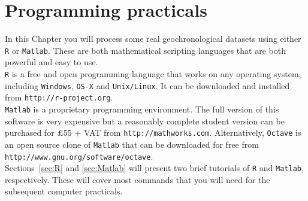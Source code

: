 \chapter{Programming practicals}
\label{sec:programming}

In this Chapter you will process some real geochronological datasets
using either \texttt{R} or \texttt{Matlab}. These are both
mathematical scripting languages that are both powerful and easy to
use.\\

\texttt{R} is a free and open programming language that works on any
operating system, including \texttt{Windows}, \texttt{OS-X} and
\texttt{Unix/Linux}. It can be downloaded and installed from
\texttt{http://r-project.org}.\\

\texttt{Matlab} is a proprietary programming environment. The full
version of this software is very expensive but a reasonably complete
student version can be purchased for $\pounds$55 + VAT from
\texttt{http://mathworks.com}. Alternatively, \texttt{Octave} is an
open source clone of \texttt{Matlab} that can be downloaded for free
from \texttt{http://www.gnu.org/software/octave}.\\

Sections~\ref{sec:R} and \ref{sec:Matlab} will present two brief
tutorials of \texttt{R} and \texttt{Matlab}, respectively.  These will
cover most commands that you will need for the subsequent computer
practicals.
